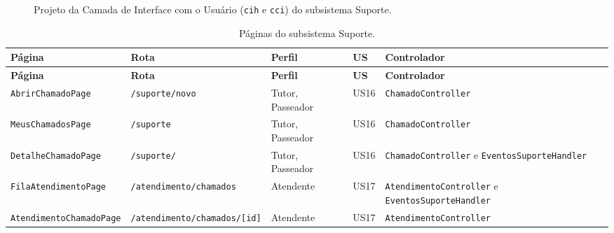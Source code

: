 \begin{figure}[h]
	\centering
	\caption{Projeto da Camada de Interface com o Usuário (\texttt{cih} e \texttt{cci}) do subsistema Suporte.}
	\label{figura-ciu-suporte}
\end{figure}

\begin{scriptsize}
\setlength{\tabcolsep}{3pt}
\begin{longtable}{|p{4.2cm}|p{3.6cm}|p{1.7cm}|p{1.3cm}|p{3.8cm}|}
	\caption{Páginas do subsistema Suporte.}
	\label{tabela-ciu-suporte}\\\hline
	\rowcolor{lightgray}
	\textbf{Página} & \textbf{Rota} & \textbf{Perfil} & \textbf{US} & \textbf{Controlador} \\\hline
	\endfirsthead
	\hline
	\rowcolor{lightgray}
	\textbf{Página} & \textbf{Rota} & \textbf{Perfil} & \textbf{US} & \textbf{Controlador} \\\hline
	\endhead
	\texttt{AbrirChamadoPage} & \texttt{/suporte/novo} & Tutor, Passeador & US16 & \texttt{Chamado\-Controller} \\\hline
	\texttt{MeusChamadosPage} & \texttt{/suporte} & Tutor, Passeador & US16 & \texttt{Chamado\-Controller} \\\hline
	\texttt{DetalheChamadoPage} & \texttt{/suporte/\allowbreak [protocolo]} & Tutor, Passeador & US16 & \texttt{Chamado\-Controller} e \texttt{EventosSuporte\-Handler} \\\hline
	\texttt{FilaAtendimentoPage} & \texttt{/atendimento/\allowbreak chamados} & Atendente & US17 & \texttt{Atendimento\-Controller} e \texttt{EventosSuporte\-Handler} \\\hline
	\texttt{AtendimentoChamadoPage} & \texttt{/atendimento/\allowbreak chamados/[id]} & Atendente & US17 & \texttt{Atendimento\-Controller} \\\hline
\end{longtable}
\end{scriptsize}


